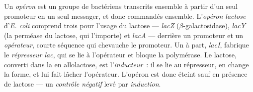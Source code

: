 \begin{definition}\label{def:b1:expression-control:operon}
Un \emph{opéron} est un groupe de  bactériens transcrits ensemble à
partir d'un seul promoteur en un seul messager, et donc commandés
ensemble. L'\emph{opéron lactose} d'\emph{E. coli} comprend trois 
pour l'usage du lactose --- \emph{lacZ} ($\beta$-galactosidase),
\emph{lacY} (la perméase du lactose, qui l'importe) et \emph{lacA} ---
derrière un promoteur et un \emph{opérateur}, courte séquence qui
chevauche le promoteur. Un  à part, \emph{lacI}, fabrique le
\emph{répresseur lac},  qui se lie à l'opérateur et bloque la
polymérase. Le lactose, converti dans la  en allolactose, est
l'\emph{inducteur}~: il se lie au répresseur, en change la forme, et lui
fait lâcher l'opérateur. L'opéron est donc éteint sauf en présence de
lactose --- un \emph{contrôle négatif} levé par \emph{induction}.
\end{definition}

